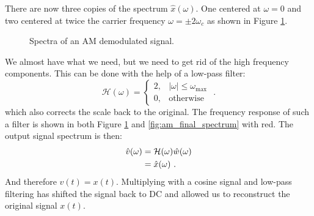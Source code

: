 There are now three copies of the spectrum $\hat{x}(\omega)$. One
centered at $\omega=0$ and two centered at twice the carrier frequency
$\omega=\pm 2\omega_c$ as shown in Figure \ref{fig:am_spectra_demod}.
\begin{figure}
\begin{center}
\end{center}
\caption{Spectra of an AM demodulated signal.}
\label{fig:am_spectra_demod}
\end{figure}

We almost have what we need, but we need to get rid of the high
frequency components. This can be done with the help of a low-pass
filter:
\begin{equation}
\mathcal{H}(\omega) = \left\{ \begin{array}{cc}
2, & |\omega| \le \omega_{\mathrm{max}} \\
0, & \mathrm{otherwise}
\end{array}\right.\,\,.
\end{equation}
which also corrects the scale back to the original. The frequency
response of such a filter is shown in both Figure \ref{fig:am_spectra_demod} and \ref{fig:am_final_spectrum} with red. The output
signal spectrum is then:
\begin{align}
\hat{v}(\omega) &= \mathcal{H}(\omega) \hat{w}(\omega) \\
           &= \hat{x}(\omega)\,\,.
\end{align}
And therefore $v(t)=x(t)$. Multiplying with a cosine signal and
low-pass filtering has shifted the signal back to DC and allowed us to
reconstruct the original signal $x(t)$.


